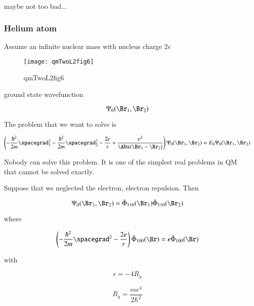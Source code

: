 maybe not too bad...

\subsubsection{Helium atom}

Assume an infinite nuclear mass with nucleus charge $2 e$

\begin{figure}[htp]
\centering
\texttt{[image: qmTwoL2fig6]}
\caption{qmTwoL2fig6}\label{fig:qmTwoL2fig6}
\end{figure}

ground state wavefunction

\begin{equation}\label{eqn:qmTwoL2:490}
\Psi_0(\Br_1, \Br_2)
\end{equation}

The problem that we want to solve is

\begin{equation}\label{eqn:qmTwoL2:510}
\left(
-\frac{\hbar^2}{2 m} \spacegrad_1^2
-\frac{\hbar^2}{2 m} \spacegrad_2^2
- \frac{2 e}{r}
+
\frac{e^2}{\Abs{\Br_1 - \Br_2}}
\right)
\Psi_0(\Br_1, \Br_2) = E_0 \Psi_0(\Br_1, \Br_2)
\end{equation}

Nobody can solve this problem.  It is one of the simplest real problems in QM that cannot be solved exactly.

Suppose that we neglected the electron, electron repulsion.  Then

\begin{equation}\label{eqn:qmTwoL2:530}
\Psi_0(\Br_1, \Br_2)
=
\bar{\Phi}_{110}(\Br_1)
\bar{\Phi}_{110}(\Br_2)
\end{equation}

where

\begin{equation}\label{eqn:qmTwoL2:550}
\left( -\frac{\hbar^2}{2 m} \spacegrad^2
- \frac{2 e}{r} \right)
\bar{\Phi}_{100}(\Br) = \epsilon \bar{\Phi}_{100}(\Br)
\end{equation}

with

\begin{equation}\label{eqn:qmTwoL2:570}
\epsilon = - 4 R_y
\end{equation}

\begin{equation}\label{eqn:qmTwoL2:590}
R_y = \frac{m e^4}{2 \hbar^2}
\end{equation}

